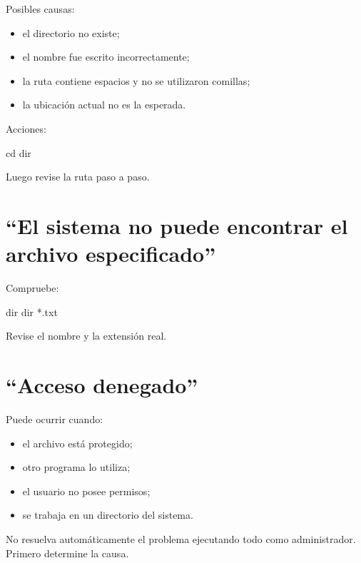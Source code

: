 \documentclass[
  spanish,
  letterpaper,
]{scrbook}
\newenvironment{Shaded}{\begin{snugshade}}{\end{snugshade}}
\newcommand{\BuiltInTok}[1]{\textcolor[rgb]{0.00,0.23,0.31}{#1}}
\newcommand{\NormalTok}[1]{\textcolor[rgb]{0.00,0.23,0.31}{#1}}
\providecommand{\tightlist}{%
  \setlength{\itemsep}{0pt}\setlength{\parskip}{0pt}}
\begin{document}
Posibles causas:

\begin{itemize}
\tightlist
\item
  el directorio no existe;
\item
  el nombre fue escrito incorrectamente;
\item
  la ruta contiene espacios y no se utilizaron comillas;
\item
  la ubicación actual no es la esperada.
\end{itemize}

Acciones:

\begin{Shaded}
\begin{Highlighting}[]
\BuiltInTok{cd}
\BuiltInTok{dir}
\end{Highlighting}
\end{Shaded}

Luego revise la ruta paso a paso.

\section{``El sistema no puede encontrar el archivo
especificado''}\label{el-sistema-no-puede-encontrar-el-archivo-especificado}

Compruebe:

\begin{Shaded}
\begin{Highlighting}[]
\BuiltInTok{dir}
\BuiltInTok{dir}\NormalTok{ *.txt}
\end{Highlighting}
\end{Shaded}

Revise el nombre y la extensión real.

\section{``Acceso denegado''}\label{acceso-denegado}

Puede ocurrir cuando:

\begin{itemize}
\tightlist
\item
  el archivo está protegido;
\item
  otro programa lo utiliza;
\item
  el usuario no posee permisos;
\item
  se trabaja en un directorio del sistema.
\end{itemize}

No resuelva automáticamente el problema ejecutando todo como
administrador. Primero determine la causa.
\end{document}
